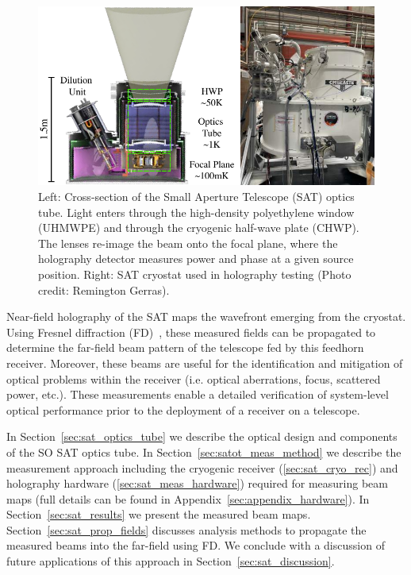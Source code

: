 \begin{figure}[t!]
    \centering
    \includegraphics[width = \textwidth]{Figures/sat_optics.pdf}
    \caption{Left: Cross-section of the Small Aperture Telescope (SAT) optics tube.  Light enters through the high-density polyethylene window (UHMWPE) and through the cryogenic half-wave plate (CHWP).  The lenses re-image the beam onto the focal plane, where the holography detector measures power and phase at a given source position.  Right: SAT cryostat used in holography testing (Photo credit: Remington Gerras).}
    \label{fig:sat_optics}
\end{figure}

Near-field holography of the SAT maps the wavefront emerging from the cryostat.  Using Fresnel diffraction (FD)~\cite{Goodman2005-ne}, these measured fields can be propagated to determine the far-field beam pattern of the telescope fed by this feedhorn receiver.  Moreover, these beams are useful for the identification and mitigation of optical problems within the receiver (i.e. optical aberrations, focus, scattered power, etc.).  These measurements enable a detailed verification of system-level optical performance prior to the deployment of a receiver on a telescope.

In Section~\ref{sec:sat_optics_tube} we describe the optical design and components of the SO SAT optics tube.  In Section~\ref{sec:satot_meas_method} we describe the measurement approach including the cryogenic receiver (\ref{sec:sat_cryo_rec}) and holography hardware (\ref{sec:sat_meas_hardware}) required for measuring beam maps (full details can be found in Appendix~\ref{sec:appendix_hardware}).  In Section~\ref{sec:sat_results} we present the measured beam maps.   Section~\ref{sec:sat_prop_fields} discusses analysis methods to propagate the measured beams into the far-field using FD.  We conclude with a discussion of future applications of this approach in Section~\ref{sec:sat_discussion}.  
